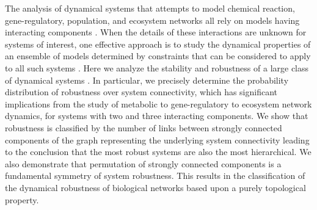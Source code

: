 The analysis of dynamical systems that attempts to model chemical reaction, gene-regulatory, population, and ecosystem networks all rely on models having interacting components \cite{RossCr2003,Alon2006,Palsson2006,HamidBolouri2008,Palsson2011a,Voit2012,Sauro2012}. When the details of these interactions are unknown for systems of interest, one effective approach is to study the dynamical properties of an ensemble of models determined by constraints that can be considered to apply to all such systems \cite{Gardner1970,May1972,Cohen1984,May1972a,Radius2014}. Here we analyze the stability and robustness of a large class of dynamical systems \cite{WADDINGTON1942a,VanNimwegen1999,Siegal2002,Ciliberti2007b,Ciliberti2007,Wagner2013}. In particular, we precisely determine the probability distribution of robustness over system connectivity, which has significant implications from the study of metabolic to gene-regulatory to ecosystem network dynamics, for systems with two and three interacting components. We show that robustness is classified by the number of links between strongly connected components of the graph representing the underlying system connectivity leading to the conclusion that the most robust systems are also the most hierarchical. We also demonstrate that permutation of strongly connected components is a fundamental symmetry of system robustness. This results in the classification of the dynamical robustness of biological networks based upon a purely topological property.
